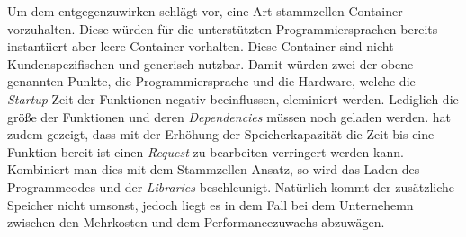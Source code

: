 \documentclass[11pt]{article}
\begin{document}
Um dem entgegenzuwirken schlägt \cite{castro2019server} vor, eine Art stammzellen Container vorzuhalten. Diese würden für die unterstützten Programmiersprachen bereits instantiiert aber leere Container vorhalten. Diese Container sind nicht Kundenspezifischen und generisch nutzbar. Damit würden zwei der obene genannten Punkte, die Programmiersprache und die Hardware, welche die \textit{Startup}-Zeit der Funktionen negativ beeinflussen, eleminiert werden. Lediglich die größe der Funktionen und deren \textit{Dependencies} müssen noch geladen werden. \cite{ishakian2018serving} hat zudem gezeigt, dass mit der Erhöhung der Speicherkapazität die Zeit bis eine Funktion bereit ist einen \textit{Request} zu bearbeiten verringert werden kann. Kombiniert man dies mit dem Stammzellen-Ansatz, so wird das Laden des Programmcodes und der \textit{Libraries} beschleunigt. Natürlich kommt der zusätzliche Speicher nicht umsonst, jedoch liegt es in dem Fall bei dem Unternehemn zwischen den Mehrkosten und dem Performancezuwachs abzuwägen. \\
\newpage
\end{document}
